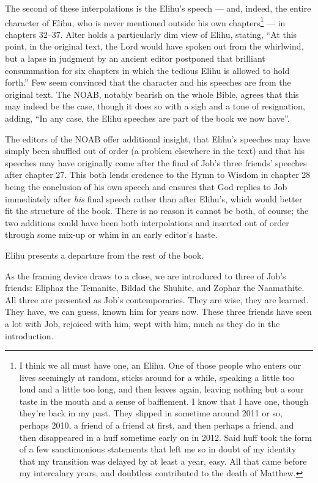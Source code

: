 
The second of these interpolations is the Elihu's speech --- and, indeed, the entire character of Elihu, who is never mentioned outside his own chapters\footnote{I think we all must have one, an Elihu. One of those people who enters our lives seemingly at random, sticks around for a while, speaking a little too loud and a little too long, and then leaves again, leaving nothing but a sour taste in the mouth and a sense of bafflement. I know that I have one, though they're back in my past. They slipped in sometime around 2011 or so, perhaps 2010, a friend of a friend at first, and then perhaps a friend, and then disappeared in a huff sometime early on in 2012. Said huff took the form of a few sanctimonious statements that left me so in doubt of my identity that my transition was delayed by at least a year, easy. All that came before my intercalary years, and doubtless contributed to the death of Matthew.} --- in chapters 32--37. Alter holds a particularly dim view of Elihu, stating, ``At this point, in the original text, the Lord would have spoken out from the whirlwind, but a lapse in judgment by an ancient editor postponed that brilliant consummation for six chapters in which the tedious Elihu is allowed to hold forth.'' \parencite[460]{alter} Few seem convinced that the character and his speeches are from the original text. The NOAB, notably bearish on the whole Bible, agrees that this may indeed be the case, though it does so with a sigh and a tone of resignation, adding, ``In any case, the Elihu speeches are part of the book we now have''. \parencite[767]{noab}

The editors of the NOAB offer additional insight, that Elihu's speeches may have simply been shuffled out of order (a problem elsewhere in the text) and that his speeches may have originally come after the final of Job's three friends' speeches after chapter 27. This both lends credence to the Hymn to Wisdom in chapter 28 being the conclusion of his own speech and ensures that God replies to Job immediately after \emph{his} final speech rather than after Elihu's, which would better fit the structure of the book. There is no reason it cannot be both, of course; the two additions could have been both interpolations and inserted out of order through some mix-up or whim in an early editor's haste.

Elihu presents a departure from the rest of the book.

As the framing device draws to a close, we are introduced to three of Job's friends: Eliphaz the Temanite, Bildad the Shuhite, and Zophar the Naamathite. All three are presented as Job's contemporaries. They are wise, they are learned. They have, we can guess, known him for years now. These three friends have seen a lot with Job, rejoiced with him, wept with him, much as they do in the introduction.

